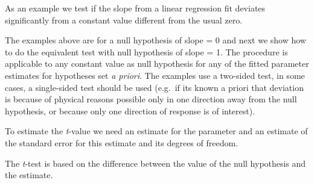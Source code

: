 \documentclass[krantz2]{krantz}\usepackage{knitr}%
\begin{document}
\begin{explainbox}
As an example we test if the slope from a linear regression fit deviates significantly from a constant value different from the usual zero.

The examples above are for a null hypothesis of slope = 0 and next we show how to do the equivalent test with null hypothesis of slope = 1. The procedure is applicable to any constant value as null hypothesis for any of the fitted parameter estimates for hypotheses set \emph{a priori}. The examples use a two-sided test, in some cases, a single-sided test should be used (e.g.\ if its known a priori that deviation is because of physical reasons possible only in one direction away from the null hypothesis, or because only one direction of response is of interest).

To estimate the \emph{t}-value we need an estimate for the parameter and an estimate of the standard error for this estimate and its degrees of freedom.
\begin{knitrout}\footnotesize
{}\color{fgcolor}\begin{kframe}
\begin{alltt}
 \hlkwb{<-} \hlopt{$}\hlstd{coef[}\hlstd{,} \hlstd{]}
 \hlkwb{<-} \hlopt{$}\hlstd{coef[}\hlstd{,} \hlstd{]}
 \hlkwb{<-} \hlopt{$}\hlstd{df[}\hlstd{]}
\end{alltt}
\end{kframe}
\end{knitrout}

The \emph{t}-test is based on the difference between the value of the null hypothesis and the estimate.

\begin{knitrout}\footnotesize
{}\color{fgcolor}\begin{kframe}
\begin{alltt}
 \hlkwb{<-} 
 \hlkwb{<-}  \hlopt{-}  \hlopt{/} 
 \hlkwb{<-}   
\end{alltt}
\end{kframe}
\end{knitrout}
\end{explainbox}
\end{document}
